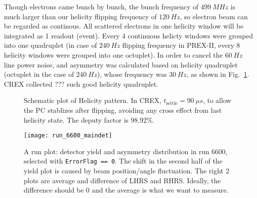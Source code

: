 Though electrons came bunch by bunch, the bunch frequency of $499\ MHz$ is much
larger than our helicity flipping frequency of $120\ Hz$, so electron beam can be regarded
as continous. All scattered electrons in one helicity window will be integrated as 1
readout (event). Every 4 continuous helicty windows were grouped into one quadruplet 
(in case of $240\ Hz$ flipping frequency in PREX-II, every 8 helicity windows 
were grouped into one octuplet).
In order to cancel the $60\ Hz$ line power noise, and asymmetry was
calculated based on helicity quadruplet (octuplet in the case of $240\ Hz$), 
whose frequency was $30\ Hz$, as shown in Fig.~\ref{fig:helicity_pattern}. 
CREX collected ??? such good helicity quadruplet.
\begin{figure}[H]
    \centering
    \caption{Schematic plot of Helicity pattern. In CREX, $t_{\text{settle}} = 90\ \mu s$, 
    to allow the PC stablizes after flipping, avoiding any cross effect from last helicity state. 
    The deputy factor is 98.92\%.}
    \label{fig:helicity_pattern}
\end{figure}
\begin{figure}
    \centering
    \texttt{[image: run\_6600\_maindet]}
    \caption{A run plot: detector yield and asymmetry distribution in run 6600, 
    selected with \texttt{ErrorFlag == 0}. The shift in the second half of the 
    yield plot is caused by beam position/angle fluctuation. 
    The right 2 plots are average and difference of LHRS and RHRS. 
    Ideally, the difference should be 0 and the average is what we want to measure.
    }
\end{figure}

